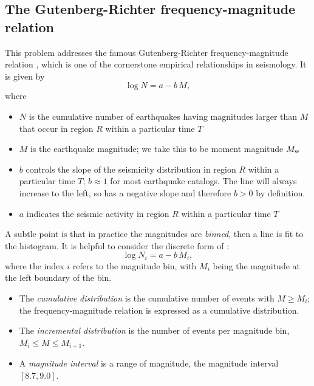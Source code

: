 \documentclass[11pt,titlepage,fleqn]{article}
\begin{document}

\subsection*{The Gutenberg-Richter frequency-magnitude relation}

This problem addresses the famous Gutenberg-Richter frequency-magnitude relation \citep{GutenbergRichter1944}, which is one of the cornerstone empirical relationships in seismology. It is given by
%
\begin{equation}
\log N = a - b\,M,
\label{GR}
\end{equation}
%
where
%
\begin{itemize}
\item $N$ is the cumulative number of earthquakes having magnitudes larger than $M$ that occur in region $R$ within a particular time $T$
\item $M$ is the earthquake magnitude; we take this to be moment magnitude $M_{\rm w}$
\item $b$ controls the slope of the seismicity distribution in region $R$ within a particular time $T$; $b \approx 1$ for most earthquake catalogs. The line will always increase to the left, so  has a negative slope and therefore $b > 0$ by definition.
\item $a$ indicates the seismic activity in region $R$ within a particular time $T$
\end{itemize}
%
A subtle point is that in practice the magnitudes are {\em binned}, then a line is fit to the histogram. It is helpful to consider the discrete form of :
%
\begin{equation}
\log N_i = a - b\,M_i,
\label{GRd}
\end{equation}
%
where the index $i$ refers to the magnitude bin, with $M_i$ being the magnitude at the left boundary of the bin.

\begin{itemize}
\item The {\em cumulative distribution} is the cumulative number of events with $M \ge M_i$; the frequency-magnitude relation is expressed as a cumulative distribution.
\item The {\em incremental distribution} is the number of events per magnitude bin, $M_i \le M \le M_{i+1}$.
\item A {\em magnitude interval} is a range of magnitude, \eg the magnitude interval $[8.7,9.0]$.
\end{itemize}
\end{document}
